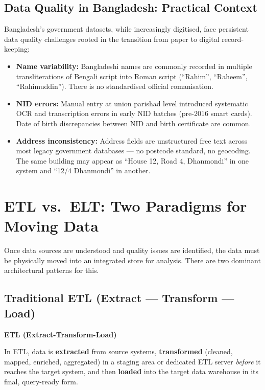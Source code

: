 \documentclass[12pt,a4paper]{article}
\newcommand{\defbox}[2]{%
  \noindent
  \colorbox{PUNavy!12}{%
    \begin{minipage}{\dimexpr\linewidth-2\fboxsep}
      \vspace{4pt}\textbf{\textcolor{PUNavy}{#1}}\par\vspace{2pt}
      #2\vspace{4pt}
    \end{minipage}%
  }\par\vspace{6pt}%
}
\begin{document}
\subsection{Data Quality in Bangladesh: Practical Context}

Bangladesh's government datasets, while increasingly digitised, face persistent data quality challenges rooted in the transition from paper to digital record-keeping:

\begin{itemize}[leftmargin=1.8em]
  \item \textbf{Name variability:} Bangladeshi names are commonly recorded in multiple transliterations of Bengali script into Roman script (``Rahim'', ``Raheem'', ``Rahimuddin'').  There is no standardised official romanisation.
  \item \textbf{NID errors:} Manual entry at union parishad level introduced systematic OCR and transcription errors in early NID batches (pre-2016 smart cards).  Date of birth discrepancies between NID and birth certificate are common.
  \item \textbf{Address inconsistency:} Address fields are unstructured free text across most legacy government databases --- no postcode standard, no geocoding.  The same building may appear as ``House 12, Road 4, Dhanmondi'' in one system and ``12/4 Dhanmondi'' in another.
\end{itemize}

\section{ETL vs.\ ELT: Two Paradigms for Moving Data}

Once data sources are understood and quality issues are identified, the data must be physically moved into an integrated store for analysis.  There are two dominant architectural patterns for this.

\subsection{Traditional ETL (Extract --- Transform --- Load)}

\defbox{ETL (Extract-Transform-Load)}{In ETL, data is \textbf{extracted} from source systems, \textbf{transformed} (cleaned, mapped, enriched, aggregated) in a staging area or dedicated ETL server \textit{before} it reaches the target system, and then \textbf{loaded} into the target data warehouse in its final, query-ready form.}
\end{document}
